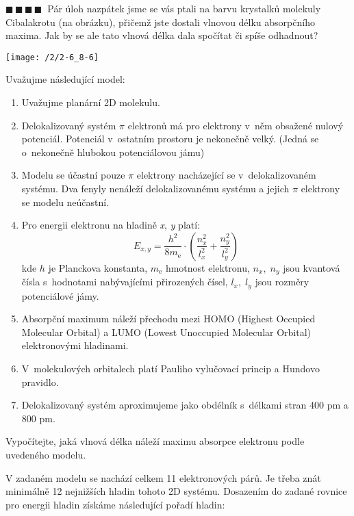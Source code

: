 \documentclass{book}
\newcommand{\ctyri}{$\blacksquare \, \blacksquare \, \blacksquare \, \blacksquare \; \; $}
\renewenvironment{quotation}{\par}{\par} %
\begin{document}
\hrulefill %
\begin{quotation}
\ctyri Pár úloh nazpátek jsme se vás ptali na barvu krystalků molekuly Cibalakrotu
(na obrázku), přičemž jste dostali vlnovou délku absorpčního maxima.
Jak by se ale tato vlnová délka dala spočítat či spíše odhadnout? 

\begin{center}
\texttt{[image: /2/2-6\_8-6]}
\end{center}

Uvažujme následující model: 

\begin{enumerate}
    

\item  Uvažujme planární 2D molekulu. 

\item  Delokalizovaný systém $\pi$ elektronů má pro elektrony v~něm obsažené
nulový potenciál. Potenciál v~ostatním prostoru je nekonečně velký. (Jedná se o~nekonečně hlubokou potenciálovou jámu) 

\item  Modelu se účastní pouze $\pi$ elektrony nacházející se v~delokalizovaném
systému. Dva fenyly nenáleží delokalizovanému systému a jejich $\pi$
elektrony se modelu neúčastní. 

\item  Pro energii elektronu na hladině \textit{x}, \textit{y} platí: 
\[
E_{x,y}=\frac{h^{2}}{8m_{\mathrm{e}}}\cdot\left(\frac{n_{x}^{2}}{l_{x}^{2}}+\frac{n_{y}^{2}}{l_{y}^{2}}\right)
\]
kde $h$ je Planckova konstanta, $m_{\mathrm{e}}$ hmotnost elektronu, $n_{x},\;n_{y}$
jsou kvantová čísla s~hodnotami nabývajícími přirozených čísel, $l_{x},\;l_{y}$
jsou rozměry potenciálové jámy. 

\item  Absorpční maximum náleží přechodu mezi HOMO (Highest Occupied Molecular
Orbital) a LUMO (Lowest Unoccupied Molecular Orbital) elektronovými
hladinami. 

\item  V~molekulových orbitalech platí Pauliho vylučovací princip a Hundovo
pravidlo. 

\item  Delokalizovaný systém aproximujeme jako obdélník s~délkami stran
400 pm a 800 pm. 
\end{enumerate}
Vypočítejte, jaká vlnová délka náleží maximu absorpce elektronu podle
uvedeného modelu. 
\end{quotation} \dotfill \par 
V zadaném modelu se nachází celkem 11 elektronových párů. Je třeba
znát minimálně 12 nejnižších hladin tohoto 2D systému. Dosazením do
zadané rovnice pro energii hladin získáme následující pořadí hladin:
\end{document}
